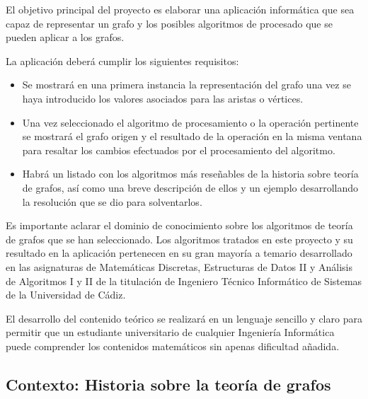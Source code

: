 \documentclass[a4paper,12pt]{article}
\begin{document}
El objetivo principal del proyecto es elaborar una aplicación informática que sea capaz de representar un grafo y los posibles algoritmos de procesado que se pueden aplicar a los grafos.

La aplicación deberá cumplir los siguientes requisitos:

\begin{itemize}
\item Se mostrará en una primera instancia la representación del grafo una vez se haya introducido los valores asociados para las aristas o vértices.

\item Una vez seleccionado el algoritmo de procesamiento o la operación pertinente se mostrará el grafo origen y el resultado de la operación en la misma ventana para resaltar los cambios efectuados por el procesamiento del algoritmo.

\item Habrá un listado con los algoritmos más reseñables de la historia sobre teoría de grafos, así como una breve descripción de ellos y un ejemplo desarrollando la resolución que se dio para solventarlos. 

\end{itemize}

Es importante aclarar el dominio de conocimiento sobre los algoritmos de teoría de grafos que se han seleccionado. Los algoritmos tratados en este proyecto y su resultado en la aplicación pertenecen en su gran mayoría a temario desarrollado en las asignaturas de Matemáticas Discretas, Estructuras de Datos II y Análisis de Algoritmos I y II de la titulación de Ingeniero Técnico Informático de Sistemas de la Universidad de Cádiz.

El desarrollo del contenido teórico se realizará en un lenguaje sencillo y claro para permitir que un estudiante universitario de cualquier Ingeniería Informática puede comprender los contenidos matemáticos sin apenas dificultad añadida.

\subsection{Contexto: Historia sobre la teoría de grafos}
\end{document}
